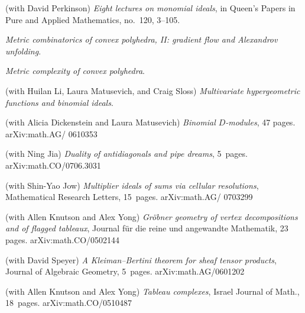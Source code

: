 \documentclass[11pt]{proposal}
\def\bibsubsec#1{\item[\textsf{\hspace{-2.2ex}\textbf{#1}}]\vspace{.5ex}\item[]\vspace{-2.5ex}}
\def\bibyear#1{\makebox[-1ex][l]{}\marginpar[{\flushright{\small#1}}]{}}
\begin{document}
\begin{thebibliography}{33}
\bibyear{2001}
(with David Perkinson) \emph{Eight lectures on monomial ideals}, in
	Queen's Papers in Pure and Applied Mathematics, no.~120,
	3--105.

\bibsubsec{\sf Articles in progress}%

\emph{Metric combinatorics of convex polyhedra, II: gradient flow and
	Alexandrov unfolding}.

\emph{Metric complexity of convex polyhedra}.

(with Huilan Li, Laura Matusevich, and Craig Sloss) \emph{Multivariate
	hypergeometric functions and binomial ideals}. 

\bibsubsec{\sf Submitted journal articles}%

(with Alicia Dickenstein and Laura Matusevich) \emph{Binomial
	$D$-modules}, 47 pages.  \textsf{arXiv:math.AG/ 0610353}

(with Ning Jia) \emph{Duality of antidiagonals and pipe dreams},
	5~pages.  \textsf{arXiv:math.CO/0706.3031}

\bibsubsec{\sf Peer-reviewed journal articles}%

\bibyear{to appear}
(with Shin-Yao Jow) \emph{Multiplier ideals of sums via cellular
	resolutions}, Mathematical Research Letters, 15~pages.
	\textsf{arXiv:math.AG/ 0703299}

(with Allen Knutson and Alex Yong) \emph{Gr\"obner geometry of vertex
	decompositions and of flagged tableaux}, Journal f\"ur die
	reine und angewandte Mathematik, 23 pages.
	\textsf{arXiv:math.CO/0502144}

(with David Speyer) \emph{A Kleiman--Bertini theorem for sheaf tensor
	products}, Journal of Algebraic Geometry, 5~pages.
	\textsf{arXiv:math.AG/0601202}

(with Allen Knutson and Alex Yong) \emph{Tableau complexes}, Israel
	Journal of Math., 18~pages. \textsf{arXiv:math.CO/0510487}


\end{thebibliography}
\end{document}
